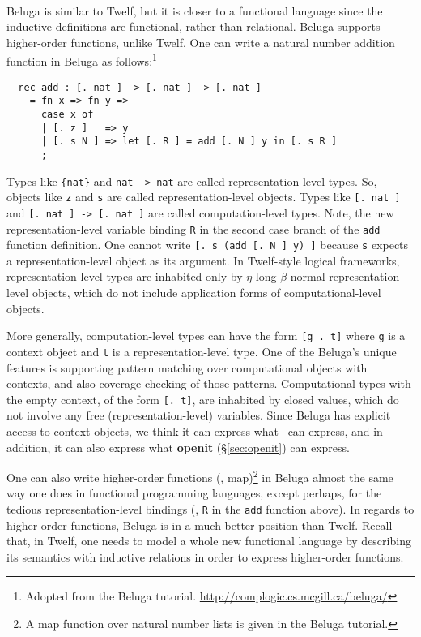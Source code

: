 \paragraph{}
Beluga \cite{Pie10} is similar to Twelf, but it is closer to
a functional language since the inductive definitions are functional,
rather than relational. Beluga supports higher-order functions, unlike Twelf.
One can write a natural number addition function in Beluga 
as follows:\footnote{
        Adopted from the Beluga tutorial.
        \url{http://complogic.cs.mcgill.ca/beluga/} }\vspace*{-2em}
\begin{singlespace}
\begin{verbatim}
  rec add : [. nat ] -> [. nat ] -> [. nat ]
    = fn x => fn y =>
      case x of
      | [. z ]   => y
      | [. s N ] => let [. R ] = add [. N ] y in [. s R ]
      ;
\end{verbatim}
\end{singlespace}\noindent
Types like \verb|{nat}| and \verb|nat -> nat| are called
representation-level types. So, objects like \verb|z| and \verb|s|
are called representation-level objects.
Types like \verb|[. nat ]| and \verb|[. nat ] -> [. nat ]| are called
computation-level types.
Note, the new representation-level variable binding \verb|R| in
the second case branch of the \verb|add| function definition.
One cannot write \verb|[. s (add [. N ] y) ]| because \verb|s|
expects a representation-level object as its argument.
In Twelf-style logical frameworks, representation-level types are
inhabited only by $\eta$-long $\beta$-normal representation-level objects,
which do not include application forms of computational-level objects.

More generally, computation-level types can have the form \verb|[g . t]|
where \verb|g| is a context object and \verb|t| is a representation-level type.
One of the Beluga's unique features is supporting pattern matching over
computational objects with contexts, and also coverage checking of those
patterns. Computational types with the empty context, of the form
\verb|[. t]|, are inhabited by closed values, which do not involve
any free (representation-level) variables.
Since Beluga has explicit access to context objects, we think
it can express what \MsfIt\ can express, and in addition, it can
also express what \textbf{openit} (\S\ref{sec:openit}) can express.

One can also write higher-order functions (\eg, map)\footnote{
        A map function over natural number lists is
        given in the Beluga tutorial. }
in Beluga almost the same way one does in functional programming languages,
except perhaps, for the tedious representation-level bindings 
(\eg, \verb|R| in the \verb|add| function above).
In regards to higher-order functions, Beluga is in a much better position
than Twelf. Recall that, in Twelf, one needs to model a whole new
functional language by describing its semantics with inductive relations
in order to express higher-order functions.

